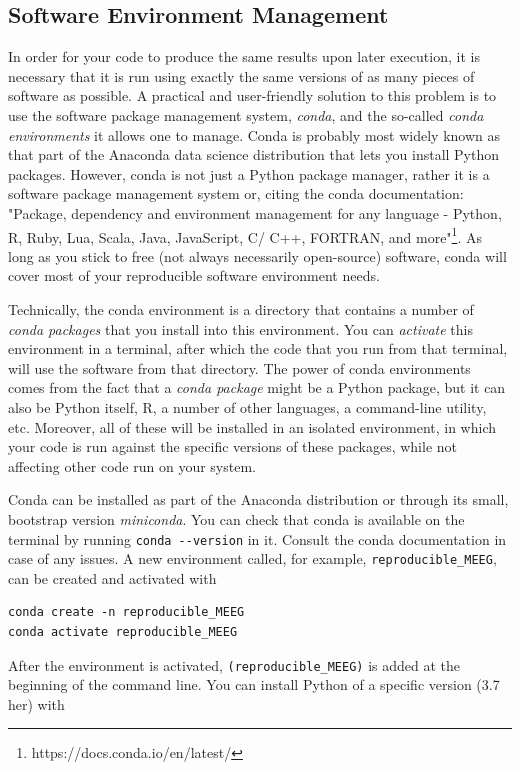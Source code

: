 \documentclass[a4paper,man,floatsintext,natbib]{apa6}
\begin{document}
\subsection{Software Environment Management}
\label{section:conda}
In order for your code to produce the same results upon later execution, it is necessary that it is run using exactly the same versions of as many pieces of software as possible. A practical and user-friendly solution to this problem is to use the software package management system, \emph{conda}, and the so-called \emph{conda environments} it allows one to manage. Conda is probably most widely known as that part of the Anaconda data science distribution that lets you install Python packages. However, conda is not just a Python package manager, rather it is a software package management system or, citing the conda documentation: "Package, dependency and environment management for any language - Python, R, Ruby, Lua, Scala, Java, JavaScript, C/ C++, FORTRAN, and more"\footnote{https://docs.conda.io/en/latest/}. As long as you stick to free (not always necessarily open-source) software, conda will cover most of your reproducible software environment needs.

Technically, the conda environment is a directory that contains a number of \emph{conda packages} that you install into this environment. You can \emph{activate} this environment in a terminal, after which the code that you run from that terminal, will use the software from that directory. The power of conda environments comes from the fact that a \emph{conda package} might be a Python package, but it can also be Python itself, R, a number of other languages, a command-line utility, etc. Moreover, all of these will be installed in an isolated environment, in which your code is run against the specific versions of these packages, while not affecting other code run on your system.

Conda can be installed as part of the Anaconda distribution or through its small, bootstrap version \emph{miniconda}. You can check that conda is available on the terminal by running \verb|conda --version| in it. Consult the conda documentation in case of any issues. A new environment called, for example, \verb|reproducible_MEEG|, can be created and activated with

\begin{verbatim}
conda create -n reproducible_MEEG
conda activate reproducible_MEEG
\end{verbatim}

After the environment is activated, \verb|(reproducible_MEEG)| is added at the beginning of the command line. You can install Python of a specific version (3.7 her) with
\end{document}
